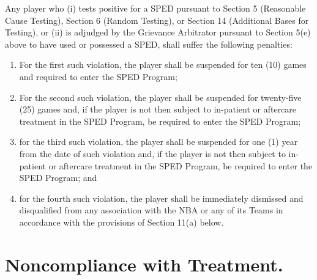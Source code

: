 \documentclass[
]{book}
\providecommand{\tightlist}{%
  \setlength{\itemsep}{0pt}\setlength{\parskip}{0pt}}
\begin{document}
\begin{enumerate}
  Any player who (i) tests positive for a SPED pursuant to Section 5 (Reasonable Cause Testing), Section 6 (Random Testing), or Section 14 (Additional Bases for Testing), or (ii) is adjudged by the Grievance Arbitrator pursuant to Section 5(e) above to have used or possessed a SPED, shall suffer the following penalties:

  \begin{enumerate}
  \def\labelenumii{(\Alph{enumii})}
  \tightlist
  \item
    For the first such violation, the player shall be suspended for ten (10) games and required to enter the SPED Program;
  \item
    For the second such violation, the player shall be suspended for twenty-five (25) games and, if the player is not then subject to in-patient or aftercare treatment in the SPED Program, be required to enter the SPED Program;
  \item
    for the third such violation, the player shall be suspended for one (1) year from the date of such violation and, if the player is not then subject to in-patient or aftercare treatment in the SPED Program, be required to enter the SPED Program; and
  \item
    for the fourth such violation, the player shall be immediately dismissed and disqualified from any association with the NBA or any of its Teams in accordance with the provisions of Section 11(a) below.
  \end{enumerate}
\end{enumerate}

\hypertarget{noncompliance-with-treatment.}{%
\section{Noncompliance with Treatment.}\label{noncompliance-with-treatment.}}
\end{document}
